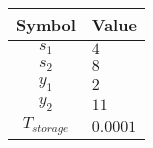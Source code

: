 \begin{tabular}{cl}
\hline
    Symbol     & Value    \\
\hline
    $s_{1}$    & $4$      \\
    $s_{2}$    & $8$      \\
    $y_{1}$    & $2$      \\
    $y_{2}$    & $11$     \\
 $T_{storage}$ & $0.0001$ \\
\hline
\end{tabular}